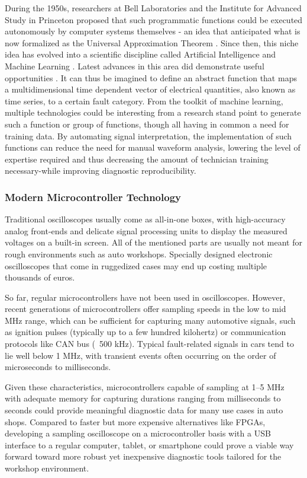 During the 1950s, researchers at Bell Laboratories and the Institute for Advanced Study in Princeton proposed that such programmatic functions could be executed autonomously by computer systems themselves 
- an idea that anticipated what is now formalized as the Universal Approximation Theorem  \cite{Cybenko1989, Hornik1991}. 
Since then, this niche idea has evolved into a scientific discipline called Artificial Intelligence and Machine Learning \cite{RussellNorvig2020, Goodfellow2016}. 
Latest advances in this area did demonstrate useful opportunities \cite{LeCun2015, Silver2016}. 
It can thus be imagined to define an abstract function that maps a multidimensional time dependent vector of electrical quantities, also known as time series, to a certain fault category. 
From the toolkit of machine learning, multiple technologies could be interesting from a research stand point to generate such a function or group of functions, though all having in common a need for training data. 
By automating signal interpretation, the implementation of such functions can reduce the need for manual waveform analysis, lowering the level of expertise required and thus decreasing the amount of technician training necessary-while improving diagnostic reproducibility.

\subsubsection{Modern Microcontroller Technology}
Traditional oscilloscopes usually come as all-in-one boxes, with high-accuracy analog front-ends and delicate signal processing units to display the measured voltages on a built-in screen. 
All of the mentioned parts are usually not meant for rough environments such as auto workshops. 
Specially designed electronic oscilloscopes that come in ruggedized cases may end up costing multiple thousands of euros.

So far, regular microcontrollers have not been used in oscilloscopes. 
However, recent generations of microcontrollers offer sampling speeds in the low to mid MHz range, which can be sufficient for capturing many automotive signals, 
such as ignition pulses (typically up to a few hundred kilohertz) or communication protocols like CAN bus (~500 kHz). 
Typical fault-related signals in cars tend to lie well below 1 MHz, with transient events often occurring on the order of microseconds to milliseconds.

Given these characteristics, microcontrollers capable of sampling at 1–5 MHz with adequate memory for capturing durations ranging from 
milliseconds to seconds could provide meaningful diagnostic data for many use cases in auto shops. 
Compared to faster but more expensive alternatives like FPGAs, developing a sampling oscilloscope on a microcontroller basis with a USB interface to a regular computer, 
tablet, or smartphone could prove a viable way forward toward more robust yet inexpensive diagnostic tools tailored for the workshop environment.

